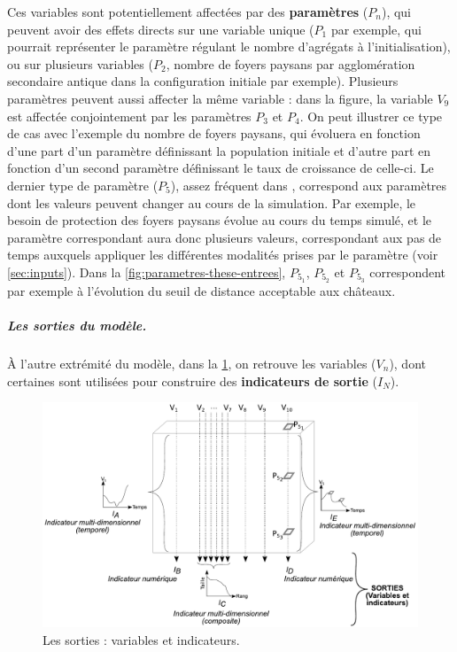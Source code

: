 Ces variables sont potentiellement affectées par des \textbf{paramètres} ($P_n$), qui peuvent avoir des effets directs sur une variable unique ($P_1$ par exemple, qui pourrait représenter le paramètre régulant le nombre d'agrégats à l'initialisation), ou sur plusieurs variables ($P_2$, nombre de foyers paysans par agglomération secondaire antique dans la configuration initiale par exemple).
Plusieurs paramètres peuvent aussi affecter la même variable : dans la figure, la variable $V_9$ est affectée conjointement par les paramètres $P_3$ et $P_4$.
On peut illustrer ce type de cas avec l'exemple du nombre de foyers paysans, qui évoluera en fonction d'une part d'un paramètre définissant la population initiale et d'autre part en fonction d'un second paramètre définissant le taux de croissance de celle-ci.
Le dernier type de paramètre ($P_5$), assez fréquent dans \simfeodal{}, correspond aux paramètres dont les valeurs peuvent changer au cours de la simulation.
Par exemple, le besoin de protection des foyers paysans évolue au cours du temps simulé, et le paramètre correspondant aura donc plusieurs valeurs, correspondant aux pas de temps auxquels appliquer les différentes modalités prises par le paramètre (voir \cref{sec:inputs}).
Dans la \cref{fig:parametres-these-entrees}, $P_{5_1}$, $P_{5_2}$ et $P_{5_3}$ correspondent par exemple à l'évolution du seuil de distance acceptable aux châteaux.

\clearpage
\subparagraph{Les sorties du modèle.}
À l'autre extrémité du modèle, dans la \cref{fig:parametres-these-sorties}, on retrouve les variables ($V_n$), dont certaines sont utilisées pour construire des \textbf{indicateurs de sortie} ($I_N$).

\begin{figure}[H]
	\includegraphics[width=\linewidth]{img/schemas_params_2_sorties.pdf}
	\caption{Les sorties : variables et indicateurs.} 
	\label{fig:parametres-these-sorties} 
\end{figure}

